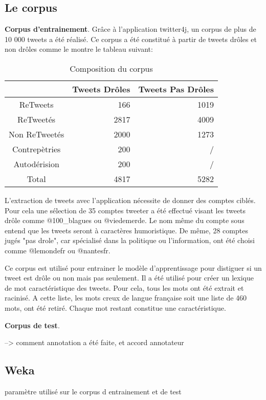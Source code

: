 \documentclass[10pt,a4paper,twoside]{article}
\begin{document}
\subsection{Le corpus}


\textbf{Corpus d'entrainement}.
Grâce à l'application twitter4j, un corpus de plus de 10 000 tweets a été réalisé. Ce corpus a été constitué à partir de tweets drôles et non drôles comme le montre le tableau suivant: 

\begin{table}[!h]
\centering
	\begin{tabular}{|c|r|r|}
	\hline
	& Tweets Drôles & Tweets Pas Drôles \\
	\hline
	 ReTweets & 166 & 1019 \\
	\hline
	 ReTweetés & 2817 & 4009 \\
	\hline
	Non ReTweetés & 2000 & 1273 \\
	\hline
	Contrepètries & 200 & / \\
	Autodérision & 200 & / \\
	\hline 
	Total & 4817 & 5282 \\
	\hline
	\end{tabular}
\caption{Composition du corpus}
\end{table}

L'extraction de tweets avec l'application nécessite de donner des comptes ciblés. Pour cela une sélection de 35 comptes tweeter a été effectué visant les tweets drôle comme @100\_blagues ou @viedemerde. Le nom même du compte sous entend que les tweets seront à caractères humoristique. De même,  28 comptes jugés "pas drole", car spécialisé dans la politique ou l'information, ont été choisi comme @lemondefr ou @nantesfr.

Ce corpus est utilisé pour entrainer le modèle d'apprentissage pour distiguer si un tweet est drôle ou non mais pas seulement. Il a été utilisé pour créer un lexique de mot caractéristique des tweets. Pour cela, tous les mots ont été extrait et racinisé. A cette liste, les mots creux de langue française soit une liste de 460 mots, ont été retiré. Chaque mot restant constitue une caractéristique.



\textbf{Corpus de test}.

--> comment annotation a été faite, et accord annotateur

\subsection{Weka}
paramètre utilisé sur le corpus d entrainement et de test
\end{document}
